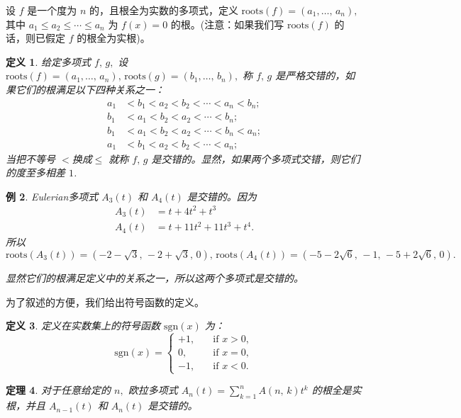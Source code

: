 \documentclass[a4paper,11pt]{article}
\newtheorem{thm}{定理}[section]
\newtheorem{defi}[thm]{定义}
\newtheorem{exa}[thm]{例}
\def \roots{\mathrm{roots}}
\def \sgn{\mathrm{sgn}}
\begin{document}
设 $f$ 是一个度为 $n$ 的，且根全为实数的多项式，定义
$\mathrm{roots}(f)=\left(a_{1},\ldots,\,a_{n}\right),$ 其中
$a_{1}\leqslant a_{2}\leqslant \cdots \leqslant a_{n}$ 为 $f(x)=0$
的根。(注意：如果我们写 $\mathrm{roots}(f)$ 的话，则已假定 $f$
的根全为实根)。

 \begin{defi} 给定多项式 $f,\,g,$
设 $\mathrm{roots}(f)=\left(a_{1},\ldots,\,a_{n}\right),\,
\mathrm{roots}(g)=\left(b_{1},\ldots,\, b_{n}\right),$ 称 $f,\,g$
是严格交错的，如果它们的根满足以下四种关系之一：
\begin{align*}
 a_{1}&<b_{1}<a_{2}<b_{2}< \cdots <a_{n}<b_{n};\\[5pt]
 b_{1}&<a_{1}<b_{2}< a_{2}< \cdots <b_{n};\\[5pt]
 b_{1}&<a_{1}<b_{2}<a_{2}< \cdots <b_{n}<a_{n};\\[5pt]
 a_{1}&<b_{1}<a_{2}< b_{2}< \cdots <a_{n};
\end{align*}
当把不等号 $<$换成$\leq$ 就称 $f,\,g$
是交错的。显然，如果两个多项式交错，则它们的度至多相差 $1$.
\end{defi}

\begin{exa}
Eulerian多项式 $A_{3}(t)$ 和 $A_{4}(t)$ 是交错的。因为
\begin{align*}
A_3(t) &=t+4t^2+t^3 \\
A_4(t) &=t+11t^2+11t^3+t^4.
\end{align*}
所以$\roots\left(A_{3}(t)\right)=\left(-2-\sqrt{3},\,-2+\sqrt{3},\,0\right),\,
\roots\left(A_{4}(t)\right)=\left(-5-2\sqrt{6},\,-1,\,-5+2\sqrt{6},\,0\right).$

显然它们的根满足定义中的关系之一，所以这两个多项式是交错的。
\end{exa}
为了叙述的方便，我们给出符号函数的定义。
 \begin{defi}
定义在实数集上的符号函数 $\sgn(x)$ 为：
$$ \sgn(x)=\left\{ \begin{array}{ll}
+1, \quad &\textrm{if $x>0,$}\\[5pt]
0 , \quad &\textrm{if $x=0,$}\\[5pt]
-1,  \quad &\textrm{if $x<0.$}
\end{array}\right.
$$
 \end{defi}
 \begin{thm}
对于任意给定的 $n,$ 欧拉多项式 $A_{n}(t)=\sum
_{k=1}^{n}A(n,\,k)t^{k}$ 的根全是实根，并且 $A_{n-1}(t)$ 和
$A_{n}(t)$ 是交错的。
\end{thm}
\end{document}
